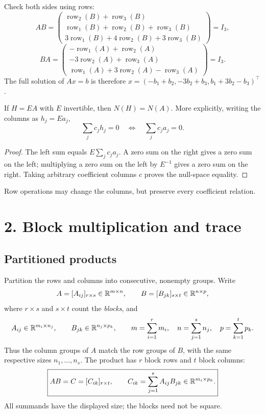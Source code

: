 \begin{example}
\[\]
Check both sides using rows:
\[
AB=\begin{pmatrix}\operatorname{row}_2(B)+\operatorname{row}_3(B)\\
\operatorname{row}_1(B)+\operatorname{row}_2(B)+\operatorname{row}_3(B)\\
3\operatorname{row}_1(B)+4\operatorname{row}_2(B)+3\operatorname{row}_3(B)
\end{pmatrix}=I_3,
\]
\[
BA=\begin{pmatrix}-\operatorname{row}_1(A)+\operatorname{row}_2(A)\\
-3\operatorname{row}_2(A)+\operatorname{row}_3(A)\\
\operatorname{row}_1(A)+3\operatorname{row}_2(A)-\operatorname{row}_3(A)
\end{pmatrix}=I_3.
\]
The full solution of \(Ax=b\) is therefore
\(x=(-b_1+b_2,-3b_2+b_3,b_1+3b_2-b_3)^\top\).
\end{example}

\begin{proposition}\label{prop:02:relations}
If \(H=EA\) with \(E\) invertible, then \(N(H)=N(A)\).
More explicitly, writing the columns as \(h_j=Ea_j\),
\[
\sum_jc_jh_j=0\quad\Longleftrightarrow\quad\sum_jc_ja_j=0.
\]
\end{proposition}
\begin{proof}
The left sum equals \(E\sum_jc_ja_j\). A zero sum on the right gives a
zero sum on the left; multiplying a zero sum on the left by \(E^{-1}\)
gives a zero sum on the right. Taking arbitrary coefficient columns
\(c\) proves the null-space equality.
\end{proof}
Row operations may change the columns, but preserve every coefficient relation.

\section*{2. Block multiplication and trace}

\subsection*{Partitioned products}
Partition the rows and columns into consecutive, nonempty groups. Write
\[
 A=[A_{ij}]_{r\times s}\in\mathbb R^{m\times n},\qquad
 B=[B_{jk}]_{s\times t}\in\mathbb R^{n\times p},
\]
where \(r\times s\) and \(s\times t\) count the \emph{blocks}, and
\[
 A_{ij}\in\mathbb R^{m_i\times n_j},\qquad
 B_{jk}\in\mathbb R^{n_j\times p_k},\qquad
 m=\sum_{i=1}^r m_i,\quad n=\sum_{j=1}^s n_j,\quad p=\sum_{k=1}^t p_k.
\]
Thus the column groups of \(A\) match the row groups of \(B\),
with the same respective sizes \(n_1,\ldots,n_s\).
The product has \(r\) block rows and \(t\) block columns:
\[
 \boxed{AB=C=[C_{ik}]_{r\times t},\qquad
 C_{ik}=\sum_{j=1}^s A_{ij}B_{jk}\in\mathbb R^{m_i\times p_k}.}
\]
All summands have the displayed size; the blocks need not be square.

